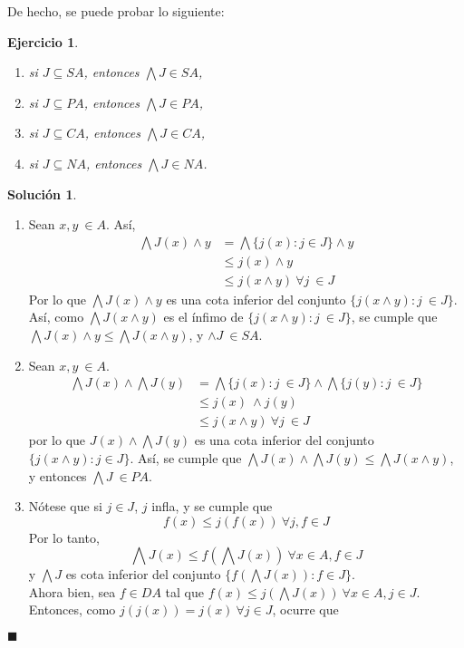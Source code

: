 \documentclass[12pt,letterpaper,titlepage]{article}
\newcommand{\xqed}[1]{%
  \leavevmode\unskip\penalty9999 \hbox{}\nobreak\hfill
  \quad\hbox{\ensuremath{#1}}}
\newtheorem{exe}{Ejercicio}
\theoremstyle{definition}
\newtheorem*{soltemp}{Solución}
\newenvironment{sol}[1]{%
    \begin{soltemp}#1}{%
    \xqed{\blacksquare}\end{soltemp}%
}
\renewcommand\inf{\wedge}
\newcommand\Inf{\bigwedge}
\newcommand\<{\langle}
\renewcommand\>{\rangle}
\begin{document}
De hecho, se puede probar lo siguiente:
\begin{exe}%
    \leavevmode
  \begin{enumerate}
    \item si $J\subseteq SA$, entonces $\Inf J\in SA$,
    \item si $J\subseteq PA$, entonces $\Inf J\in PA$,
    \item si $J\subseteq CA$, entonces $\Inf J\in CA$,
    \item si $J\subseteq NA$, entonces $\Inf J\in NA$.
  \end{enumerate}
\end{exe}
\begin{sol}
    \begin{enumerate}
        \item Sean $x,y \ \in A$.  Así, 
        \begin{align*}
            \Inf J(x)\inf y&=\Inf\{j(x):j\in J\}\inf y\\
            &\leq j(x)\inf y\\
            &\leq j(x\inf y) \ \forall j \ \in J
        \end{align*}
        Por lo que $\Inf J(x)\inf y$ es una cota inferior del conjunto $\{j(x\inf y) : j \ \in J\}$. Así, como $\Inf J(x\inf y)$ es el ínfimo de $\{j(x\inf y) : j \ \in J\}$, se cumple que $\Inf J(x)\inf y\leq \Inf J(x\inf y)$, y $\inf J \ \in SA$.
        \item Sean $x, y \ \in A$. 
        \begin{align*}
            \Inf J(x)\inf \Inf J(y)&=\Inf\{j(x):j \ \in J\} \inf \Inf \{j(y) : j \ \in J\}\\
            &\leq j(x) \ \inf j(y) \\
            &\leq j(x\inf y) \ \forall j \ \in J
        \end{align*}
        por lo que $J(x)\inf \Inf J(y)$ es una cota inferior del conjunto $\{j(x\inf y): j \in J\}$. Así, se cumple que $\Inf J(x) \inf \Inf J(y)\leq \Inf J(x\inf y)$, y entonces $\Inf J \ \in PA$.
        \item Nótese que si $j\in J$, $j$ infla, y se cumple que 
        $$f(x)\leq j(f(x)) \ \forall j,f \in J$$
        Por lo tanto, 
        $$\Inf J(x)\leq f(\Inf J(x)) \ \forall x\in A, f\in J$$
        y $\Inf J$ es cota inferior del conjunto $\{f(\Inf J(x)):f\in J\}$.
        \\
        Ahora bien, sea $f\in DA$ tal que $f(x) \leq j(\Inf J(x)) \ \forall x\in A, j\in J$. Entonces, como $j(j(x))=j(x) \ \forall j\in J$, ocurre que 

\end{enumerate}
\end{sol}
\end{document}
